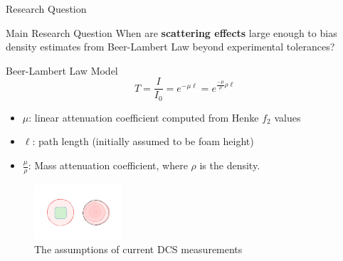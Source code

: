 \documentclass[aspectratio=169,xcolor=dvipsnames]{beamer}
\begin{document}
\begin{frame}{Research Question}
  \begin{block}{Main Research Question}
    When are \textbf{scattering effects} large enough to bias density estimates from Beer-Lambert Law beyond experimental tolerances?
  \end{block}

\end{frame}


\begin{frame}{Beer-Lambert Law Model}
  \begin{equation*}
    T = \frac{I}{I_0} =e^{-\mu \ell} = e^{\frac{-\mu }{\rho}{\rho}\ell}
  \end{equation*}
  \begin{itemize}
    \item $\mu$: linear attenuation coefficient computed from Henke $f_2$ values
    \item $\ell$: path length (initially assumed to be foam height)
    \item $\frac{\mu}{\rho}$: Mass attenuation coefficient, where $\rho$ is the density.
  \end{itemize}
    \begin{figure}[h!]
    \centering
    \includegraphics[width=0.29\textwidth]{circular.png}
    \caption{The assumptions of current DCS measurements}
  \end{figure}
\end{frame}
\end{document}
